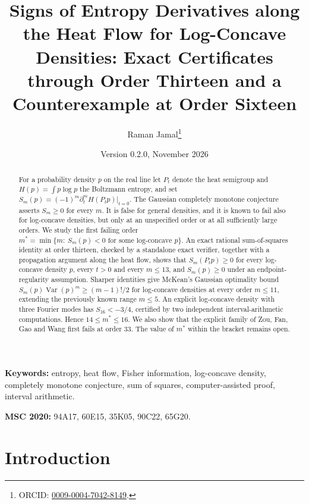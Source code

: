 \documentclass[11pt]{article}
\title{Signs of Entropy Derivatives along the Heat Flow for Log-Concave Densities:
Exact Certificates through Order Thirteen and a Counterexample at Order Sixteen}
\author{Raman Jamal\thanks{ORCID: \href{https://orcid.org/0009-0004-7042-8149}{0009-0004-7042-8149}.}}
\date{Version 0.2.0, November 2026}
\theoremstyle{definition}
\theoremstyle{remark}
\newcommand{\Var}{\operatorname{Var}}
\begin{document}
\maketitle

\begin{abstract}
For a probability density $p$ on the real line let $P_t$ denote the heat semigroup
and $H(p)=\int p\log p$ the Boltzmann entropy, and set
$S_m(p)=(-1)^m\partial_t^mH(P_tp)|_{t=0}$. The Gaussian completely monotone
conjecture asserts $S_m\ge0$ for every $m$. It is false for general densities, and
it is known to fail also for log-concave densities, but only at an unspecified order
or at all sufficiently large orders. We study the first failing order
$m^*=\min\{m:\ S_m(p)<0\text{ for some log-concave }p\}$. An exact rational
sum-of-squares identity at order thirteen, checked by a standalone exact verifier,
together with a propagation argument along the heat flow, shows that
$S_m(P_tp)\ge0$ for every log-concave density $p$, every $t>0$ and every $m\le13$,
and $S_m(p)\ge0$ under an endpoint-regularity assumption. Sharper identities give
McKean's Gaussian optimality bound $S_m(p)\Var(p)^m\ge(m-1)!/2$ for log-concave
densities at every order $m\le11$, extending the previously known range $m\le5$. An explicit
log-concave density with three Fourier modes has $S_{16}<-3/4$, certified by two
independent interval-arithmetic computations. Hence $14\le m^*\le16$. We also show
that the explicit family of Zou, Fan, Gao and Wang first fails at order $33$.
The value of $m^*$ within the bracket remains open.
\end{abstract}

\noindent\textbf{Keywords:} entropy, heat flow, Fisher information, log-concave
density, completely monotone conjecture, sum of squares, computer-assisted proof,
interval arithmetic.

\noindent\textbf{MSC 2020:} 94A17, 60E15, 35K05, 90C22, 65G20.

\section{Introduction}
\end{document}
